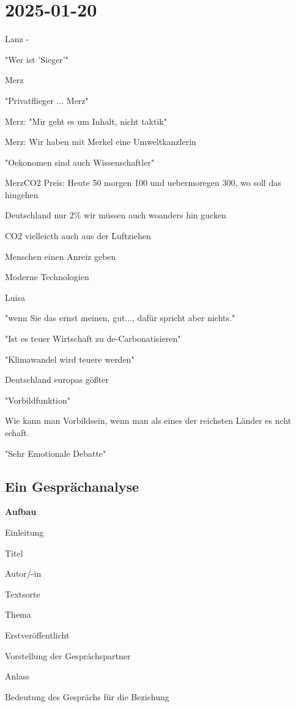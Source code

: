 \section{2025-01-20}

Lanz - 

"Wer ist 'Sieger'"

\startitemize[packed]
\item Merz
\startitemize[packed]
\item "Privatflieger ... Merz"
\item Merz: "Mir geht es um Inhalt, nicht taktik"
\item Merz: Wir haben mit Merkel eine Umweltkanzlerin
\item "Oekonomen sind auch Wissenschaftler"
\item MerzCO2 Preis: Heute 50 morgen 100 und uebermoregen 300, wo soll das hingehen
\item Deutschland nur 2\% wir müssen auch woanders hin gucken
\item CO2 vielleicth auch aus der Luftziehen
\item Menschen einen Anreiz geben
\item Moderne Technologien
\stopitemize
\item Luisa
\startitemize[packed]
\item "wenn Sie das ernst meinen, gut..., dafür spricht aber nichts."
\item "Ist es teuer Wirtschaft zu de-Carbonatisieren"
\item "Klimawandel wird teuere werden"
\item Deutschland europas gößter
\item "Vorbildfunktion"
\item Wie kann man Vorbildsein, wenn man als eines der reichsten Länder es ncht schaft.
\stopitemize
\stopitemize

"Sehr Emotionale Debatte"

\subsection{Ein Gesprächanalyse}

\startframedtipp
{\bf Aufbau}

\startitemize[packed,m]
\item Einleitung
\startitemize[packed]
\item Titel
\item Autor/-in
\item Textsorte
\item Thema
\item Erstveröffentlicht
\stopitemize
\item Vorstellung der Gesprächspartner
\item Anlass
\item Bedeutung des Gesprächs für die Beziehung
\stopitemize
\stopframedtipp

